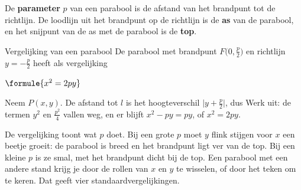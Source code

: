\begin{theorie}
De \textbf{\textcolor{accent}{parameter}} $p$ van een parabool is de afstand van het brandpunt tot de richtlijn. De loodlijn uit het brandpunt op de richtlijn is de \textbf{\textcolor{accent}{as}} van de parabool, en het snijpunt van de as met de parabool is de \textbf{\textcolor{accent}{top}}.

\begin{minipage}[t]{.62\linewidth}
\vspace{0pt}
\begin{stelling}{Vergelijking van een parabool}
De parabool met brandpunt ${F\bigl(0, \tfrac p2\bigr)}$ en richtlijn ${y = -\tfrac p2}$ heeft als vergelijking

\vspace{1mm}
\qquad $\formule{x^2 = 2py}$
\end{stelling}

\begin{bewijs}
Neem $P(x, y)$. De afstand tot $l$ is het hoogteverschil ${\bigl|y + \tfrac p2\bigr|}$, dus
Werk uit: de termen $y^2$ en $\tfrac{p^2}{4}$ vallen weg, en er blijft $x^2 - py = py$, of $x^2 = 2py$.
\end{bewijs}
\end{minipage}\hfill
\begin{minipage}[t]{.34\linewidth}
\vspace{0pt}
\centering
{}
\end{minipage}
\end{theorie}

De vergelijking toont wat $p$ doet. Bij een grote $p$ moet $y$ flink stijgen voor $x$ een beetje groeit: de parabool is breed en het brandpunt ligt ver van de top. Bij een kleine $p$ is ze smal, met het brandpunt dicht bij de top. Een parabool met een andere stand krijg je door de rollen van $x$ en $y$ te wisselen, of door het teken om te keren. Dat geeft vier standaardvergelijkingen.

